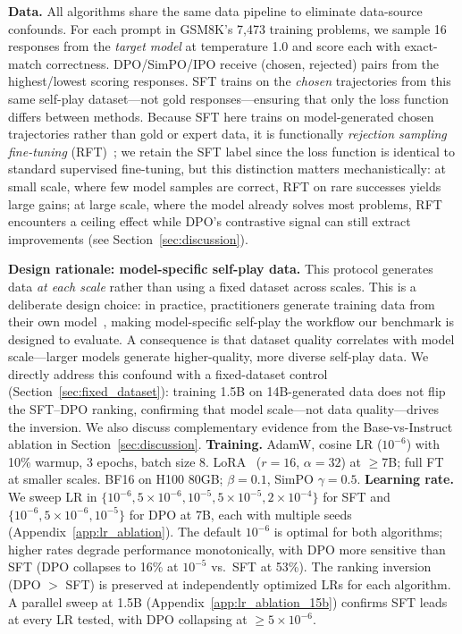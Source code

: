 \documentclass{article}
\begin{document}
\textbf{Data.} All algorithms share the same data pipeline to eliminate data-source confounds. For each prompt in GSM8K's 7,473 training problems, we sample 16 responses from the \emph{target model} at temperature 1.0 and score each with exact-match correctness. DPO/SimPO/IPO receive (chosen, rejected) pairs from the highest/lowest scoring responses. SFT trains on the \emph{chosen} trajectories from this same self-play dataset---not gold responses---ensuring that only the loss function differs between methods. Because SFT here trains on model-generated chosen trajectories rather than gold or expert data, it is functionally \emph{rejection sampling fine-tuning} (RFT)~\citep{yuan2023rft}; we retain the SFT label since the loss function is identical to standard supervised fine-tuning, but this distinction matters mechanistically: at small scale, where few model samples are correct, RFT on rare successes yields large gains; at large scale, where the model already solves most problems, RFT encounters a ceiling effect while DPO's contrastive signal can still extract improvements (see Section~\ref{sec:discussion}).

\textbf{Design rationale: model-specific self-play data.} This protocol generates data \emph{at each scale} rather than using a fixed dataset across scales. This is a deliberate design choice: in practice, practitioners generate training data from their own model~\citep{shao2024deepseekmath, deepseek2025r1, chen2024spin}, making model-specific self-play the workflow our benchmark is designed to evaluate. A consequence is that dataset quality correlates with model scale---larger models generate higher-quality, more diverse self-play data. We directly address this confound with a fixed-dataset control (Section~\ref{sec:fixed_dataset}): training 1.5B on 14B-generated data does not flip the SFT--DPO ranking, confirming that model scale---not data quality---drives the inversion. We also discuss complementary evidence from the Base-vs-Instruct ablation in Section~\ref{sec:discussion}.
\textbf{Training.} AdamW, cosine LR ($10^{-6}$) with 10\% warmup, 3 epochs, batch size 8. LoRA~\citep{hu2022lora} ($r\!=\!16$, $\alpha\!=\!32$) at $\geq$7B; full FT at smaller scales. BF16 on H100 80GB; $\beta\!=\!0.1$, SimPO $\gamma\!=\!0.5$.
\textbf{Learning rate.} We sweep LR in $\{10^{-6}, 5{\times}10^{-6}, 10^{-5}, 5{\times}10^{-5}, 2{\times}10^{-4}\}$ for SFT and $\{10^{-6}, 5{\times}10^{-6}, 10^{-5}\}$ for DPO at 7B, each with multiple seeds (Appendix~\ref{app:lr_ablation}). The default $10^{-6}$ is optimal for both algorithms; higher rates degrade performance monotonically, with DPO more sensitive than SFT (DPO collapses to 16\% at $10^{-5}$ vs.\ SFT at 53\%). The ranking inversion (DPO $>$ SFT) is preserved at independently optimized LRs for each algorithm. A parallel sweep at 1.5B (Appendix~\ref{app:lr_ablation_15b}) confirms SFT leads at every LR tested, with DPO collapsing at $\geq 5 \times 10^{-6}$.
\end{document}
